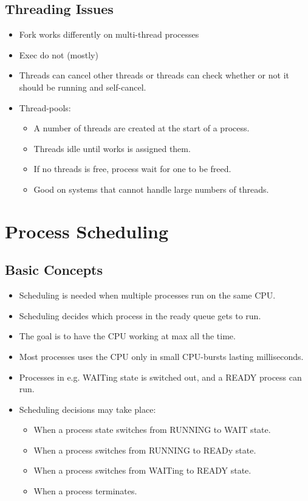 \documentclass[a4wide,10pt]{article}
\begin{document}
\subsection{Threading Issues} %
\label{sub:threading_issues}
\begin{itemize}
	\item Fork works differently on multi-thread processes
	\item Exec do not (mostly)
	\item Threads can cancel other threads or threads can check whether or not it should be running and self-cancel.
	\item Thread-pools:
	\begin{itemize}
		\item A number of threads are created at the start of a process.
		\item Threads idle until works is assigned them.
		\item If no threads is free, process wait for one to be freed.
		\item Good on systems that cannot handle large numbers of threads.
	\end{itemize}
\end{itemize}

\section{Process Scheduling} %
\label{sec:process_scheduling}
\subsection{Basic Concepts} %
\label{sub:basic_concepts}
\begin{itemize}
	\item Scheduling is needed when multiple processes run on the same CPU.
	\item Scheduling decides which process in the ready queue gets to run.
	\item The goal is to have the CPU working at max all the time.
	\item Most processes uses the CPU only in small CPU-bursts lasting milliseconds.
	\item Processes in e.g. WAITing state is switched out, and a READY process can run.
	\item Scheduling decisions may take place:
	\begin{itemize}
		\item When a process state switches from RUNNING to WAIT state.
		\item When a process switches from RUNNING to READy state.
		\item When a process switches from WAITing to READY state.
		\item When a process terminates.
	\end{itemize}
\end{itemize}
\end{document}
